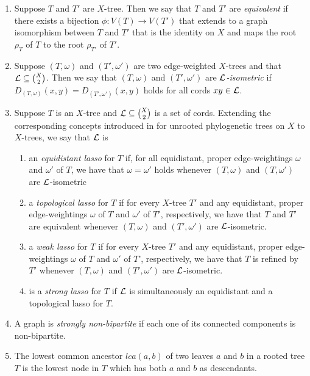 \begin{enumerate}
\item Suppose $T$ and $T'$ are $X$-tree. Then we say that $T$ and $T'$ are
  {\em equivalent} if there exists a bijection $\phi:V(T)\to V(T')$ that
  extends to a graph isomorphism between $T$ and $T'$ that is the identity on
  $X$ and maps the root $\rho_T$ of $T$ to the root $\rho_{T'}$ of $T'$.

\item Suppose $(T,\omega)$ and $(T',\omega')$ are two edge-weighted $X$-trees
  and that ${\mathcal L}\subseteq {X\choose 2}$. Then we say that $(T,\omega)$ and
  $(T',\omega')$ are {\em ${\mathcal L}$-isometric} if
  $D_{(T,\omega)}(x,y)=D_{(T',\omega')}(x,y)$ holds for all cords $xy\in {\mathcal L}$.

\item Suppose $T$ is an $X$-tree and ${\mathcal L}\subseteq {X\choose 2}$ is a set of
  cords. Extending the corresponding concepts introduced in
  \cite{dress2011lassoing} for unrooted phylogenetic trees on $X$ to
  $X$-trees, we say that ${\mathcal L}$ is
  \begin{enumerate}
  \item an {\em equidistant lasso} for $T$ if, for all equidistant, proper
    edge-weightings $\omega$ and $\omega'$ of $T$, we have that
    $\omega=\omega'$ holds whenever $(T,\omega)$ and $(T,\omega')$ are
    ${\mathcal L}$-isometric
  \item a {\em topological lasso} for $T$ if for every $X$-tree $T'$ and any
    equidistant, proper edge-weightings $\omega$ of $T$ and $\omega'$ of $T'$,
    respectively, we have that $T$ and $T'$ are equivalent whenever
    $(T,\omega)$ and $(T',\omega')$ are ${\mathcal L}$-isometric.
  \item a {\em weak lasso} for $T$ if for every $X$-tree $T'$ and any
    equidistant, proper edge-weightings $\omega$ of $T$ and $\omega'$ of $T$',
    respectively, we have that $T$ is refined by $T'$ whenever $(T,\omega)$
    and $(T',\omega')$ are ${\mathcal L}$-isometric.

  \item is a {\em strong lasso} for $T$ if ${\mathcal L}$ is simultaneously an
    equidistant and a topological lasso for $T$.
  \end{enumerate}

\item A graph is {\em strongly non-bipartite} if each one of its connected
  components is non-bipartite.
\item The lowest common ancestor $lca(a,b)$ of two leaves $a$ and $b$ in a
  rooted tree $T$ is the lowest node in $T$ which has both $a$ and $b$ as
  descendants.
\end{enumerate}

